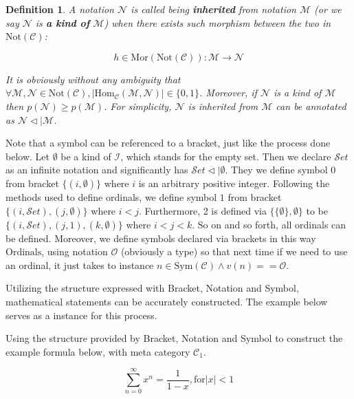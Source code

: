 \documentclass{article}
\newtheorem{definition}{Definition}	%
\numberwithin{theorem}{section}	%
\numberwithin{axiom}{section}	%
\numberwithin{definition}{section}	%
\begin{document}
\begin{definition}
	A notation \(\mathcal{N}\) is called being \textbf{ inherited} from notation \(\mathcal{M}\) (or we say \(\mathcal{N}\) is\textbf{  a kind of} \(\mathcal{M}\)) when there exists such morphism between the two in \(\text{Not}(\mathcal{C})\):
	
	\[h\in \text{Mor}(\text{Not}(\mathcal{C})): \mathcal{M}\to \mathcal{N}\]
	
	It is obviously without any ambiguity that \(\forall \mathcal{M},\mathcal{N}\in \text{Not}(\mathcal{C}),\left|\text{Hom}_{\mathcal{C}}(\mathcal{M},\mathcal{N})\right|\in \{0,1\}\). Moreover, if \(\mathcal{N}\) is a kind of \(\mathcal{M}\) then \(\mathit{p}(\mathcal{N})\geq \mathit{p}(\mathcal{M})\). For simplicity, \(\mathcal{N}\) is inherited from \(\mathcal{M}\) can be annotated as \(\mathcal{N}\triangleleft |\mathcal{M}\).
\end{definition}

Note that a symbol can be referenced to a bracket, just like the process done below. Let \(\emptyset\) be a kind of \(\mathcal{I}\), which stands for the empty set. Then we declare \(\mathcal{S}\mathit{e}\mathit{t}\) as an infinite notation and significantly has \(\mathcal{S}\mathit{e}\mathit{t}\triangleleft |\emptyset\). They we define symbol \(0\) from bracket \(\{(i,\emptyset )\}\) where \(i\) is an arbitrary positive integer. Following the methods used to define ordinals, we define symbol \(1\) from bracket \(\{(i,\mathcal{S}\mathit{e}\mathit{t}),(j,\emptyset )\}\) where \(i<j\). Furthermore, 2 is defined via \(\{\{\emptyset \},\emptyset \}\) to be \(\{(i,\mathcal{S}\mathit{e}\mathit{t}),(j,1),(k,\emptyset )\}\) where \(i<j<k\). So on and so forth, all ordinals can be defined. Moreover, we define symbols declared via brackets in this way \(\text{Ordinals}\), using notation \(\mathcal{O}\) (obviously a type) so that next time if we need to use an ordinal, it just takes to instance \(n\in \text{Sym}(\mathcal{C})\land \mathit{v}(n)==\mathcal{O}\).

Utilizing the structure expressed with Bracket, Notation and Symbol, mathematical statements can be accurately constructed. The example below serves as a instance for this process.

Using the structure provided by Bracket, Notation and Symbol to construct the example formula below, with meta category \(\mathcal{C}_1\).

\[\sum _{n=0}^{\infty } x^n=\frac{1}{1-x}, \text{for} |x|<1\]
\end{document}
